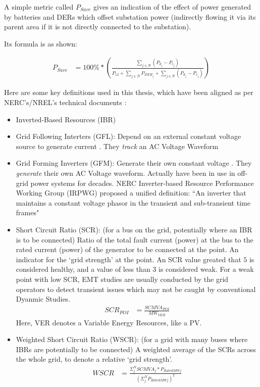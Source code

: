A simple metric called $P_{Save}$ gives an indication of the effect of power
generated by batteries and DERs which offset substation power 
(indirectly flowing it via its parent area if it is not directly connected to 
the substation).

Its formula is as shown:

\begin{align}
	{P_{Save}} &= {100\% * \left(\frac{\sum_{j \in \mathcal{B}}\left( P_{d_j} - P_{c_j} \right)}{P_{12} + 
	\sum_{j \in \mathcal{D}} P_{DER_j} +  \sum_{j \in \mathcal{B}}\left( P_{d_j} - P_{c_j} \right)} \right)}
\end{align}


Here are some key definitions used in this thesis, which have been aligned as per NERC's/NREL's technical documents \cite*{nercRes01,nercIBR00}:

\begin{itemize}
	\item Inverted-Based Resources (IBR) \cite*{nercRes01}
	\item Grid Following Interters (GFL): Depend on an external constant voltage source to generate current \cite*{nercIBR00}. They \textit{track} an AC Voltage Waveform
	\item Grid Forming Inverters (GFM): Generate their own constant voltage \cite*{nercIBR00}. They \textit{generate} their own AC Voltage waveform. Actually have been in use in off-grid power systems for decades. NERC Inverter-based Resource Performance Working Group (IRPWG) proposed a unified definition: ``An inverter that maintains a constant voltage phasor in
	the transient and sub-transient time frames"
	\item Short Circuit Ratio (SCR): (for a bus on the grid, potentially where an IBR is to be connected) Ratio of the total fault current (power) at the bus to the rated current (power) of the generator to be connected at the point. An indicator for the `grid strength' at the point. An SCR value greated that $5$ is considered healthy, and a value of less than $3$ is considered weak. For a weak point with low SCR, EMT studies are usually conducted by the grid operators to detect transient issues which may not be caught by conventional Dyanmic Studies.
	\begin{align*}
		SCR_{POI} &= \frac{SCMVA_{POI}}{MW_{VER}}
	\end{align*}
	Here, VER denotes a Variable Energy Resources, like a PV.
	\item Weighted Short Circuit Ratio (WSCR): (for a grid with many buses where IBRs are potentially to be connected) A weighted average of the SCRs across the whole grid, to denote a relative `grid strength'.
	\begin{align*}
		WSCR &= \frac{\Sigma^{N}_{j} SCMVA_{j} * P_{Rated MW j}}{(\Sigma^{N}_{j} P_{Rated MW j})^2}
	\end{align*}
\end{itemize}